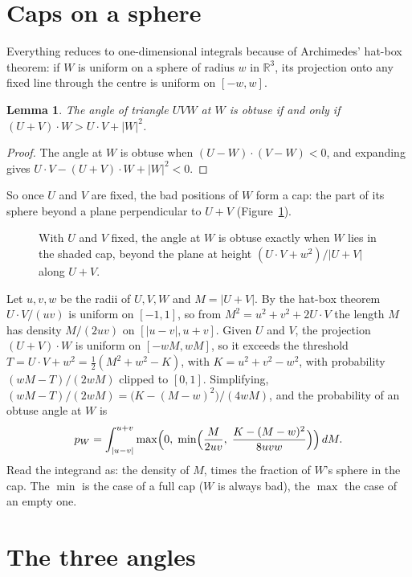 \documentclass[11pt]{article}
\newtheorem{lemma}{Lemma}
\theoremstyle{remark}
\begin{document}
\section{Caps on a sphere}

Everything reduces to one-dimensional integrals because of Archimedes' hat-box theorem: if $W$ is uniform on a
sphere of radius $w$ in $\mathbb R^3$, its projection onto any fixed line through the centre is uniform on
$[-w,w]$.

\begin{lemma}\label{lem:obtuse}
The angle of triangle $UVW$ at $W$ is obtuse if and only if $(U+V)\cdot W>U\cdot V+|W|^2$.
\end{lemma}

\begin{proof}
The angle at $W$ is obtuse when $(U-W)\cdot(V-W)<0$, and expanding gives
$U\cdot V-(U+V)\cdot W+|W|^2<0$.
\end{proof}

So once $U$ and $V$ are fixed, the bad positions of $W$ form a cap: the part of its sphere beyond a plane
perpendicular to $U+V$ (Figure~\ref{fig:cap}).

\begin{figure}[ht]
\centering

\caption{With $U$ and $V$ fixed, the angle at $W$ is obtuse exactly when $W$ lies in the shaded cap, beyond the
plane at height $(U\cdot V+w^2)/|U+V|$ along $U+V$.}
\label{fig:cap}
\end{figure}

Let $u,v,w$ be the radii of $U,V,W$ and $M=|U+V|$. By the hat-box theorem $U\cdot V/(uv)$ is uniform on
$[-1,1]$, so from $M^2=u^2+v^2+2U\cdot V$ the length $M$ has density $M/(2uv)$ on $[|u-v|,u+v]$. Given $U$ and
$V$, the projection $(U+V)\cdot W$ is uniform on $[-wM,wM]$, so it exceeds the threshold $T=U\cdot
V+w^2=\frac12(M^2+w^2-K)$, with $K=u^2+v^2-w^2$, with probability $(wM-T)/(2wM)$ clipped to $[0,1]$.
Simplifying, $(wM-T)/(2wM)=\bigl(K-(M-w)^2\bigr)/(4wM)$, and the probability of an obtuse angle at $W$ is
\begin{equation}\label{eq:pw}
p_W=\int_{|u-v|}^{u+v}\max\Bigl(0,\;\min\Bigl(\frac M{2uv},\;\frac{K-(M-w)^2}{8uvw}\Bigr)\Bigr)\,dM .
\end{equation}
Read the integrand as: the density of $M$, times the fraction of $W$'s sphere in the cap. The $\min$ is the
case of a full cap ($W$ is always bad), the $\max$ the case of an empty one.

\section{The three angles}
\end{document}
